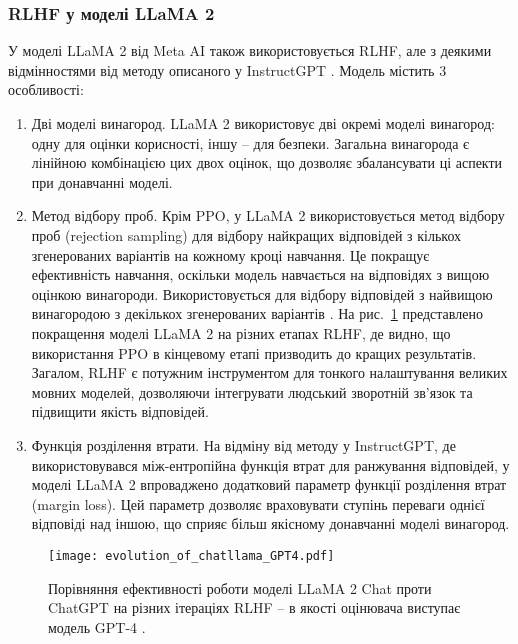 \subsubsection{RLHF у моделі LLaMA 2}

У моделі LLaMA 2 від Meta AI також використовується RLHF, але з деякими відмінностями від методу описаного у InstructGPT \cite{touvron2023llama2openfoundation}. Модель містить 3 особливості:
\begin{enumerate}
    \item {Дві моделі винагород.} LLaMA 2 використовує дві окремі моделі винагород: одну для оцінки корисності, іншу -- для безпеки. Загальна винагорода є лінійною комбінацією цих двох оцінок, що дозволяє збалансувати ці аспекти при донавчанні моделі.
    \item {Метод відбору проб.} Крім PPO, у LLaMA 2 використовується метод відбору проб (rejection sampling) для відбору найкращих відповідей з кількох згенерованих варіантів на кожному кроці навчання. Це покращує ефективність навчання, оскільки модель навчається на відповідях з вищою оцінкою винагороди. Використовується для відбору відповідей з найвищою винагородою з декількох згенерованих варіантів \cite{ziegler2020finetuninglanguagemodelshuman}. На рис.~\ref{fig:llama2_performance} представлено покращення моделі LLaMA 2 на різних етапах RLHF, де видно, що використання PPO в кінцевому етапі призводить до кращих результатів.
    Загалом, RLHF є потужним інструментом для тонкого налаштування великих мовних моделей, дозволяючи інтегрувати людський зворотній зв'язок та підвищити якість відповідей.
    \item {Функція розділення втрати.} На відміну від методу у InstructGPT, де використовувався між-ентропійна функція втрат для ранжування відповідей, у моделі LLaMA 2 впроваджено додатковий параметр функції розділення втрат (margin loss). Цей параметр дозволяє враховувати ступінь переваги однієї відповіді над іншою, що сприяє більш якісному донавчанні моделі винагород.
\end{enumerate}

\begin{figure}[h]
    \centering
    \texttt{[image: evolution\_of\_chatllama\_GPT4.pdf]}
    \caption{Порівняння ефективності роботи моделі LLaMA 2 Chat проти ChatGPT на різних ітераціях RLHF -- в якості оцінювача виступає модель GPT-4 \cite{touvron2023llama2openfoundation}.}
    \label{fig:llama2_performance}
\end{figure}

